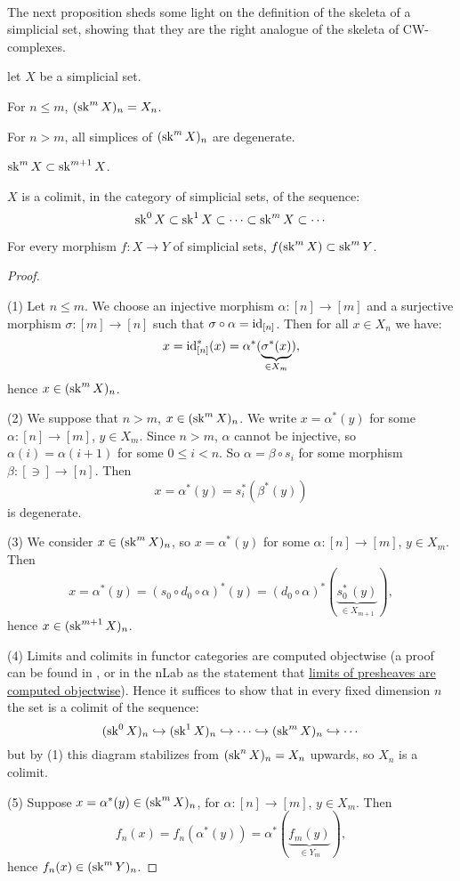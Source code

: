 
\ 


The next proposition sheds some light on the definition of the skeleta of a simplicial set, showing that they are the right analogue of the skeleta of CW-complexes.

\begin{proposition}\label{proposition:getting-to-know-the-simplicial-skeleton}
let $X$ be a simplicial set.
\begin{numerate}
\item For $n\le m$, $(\operatorname{sk}^m X)_n=X_n$.
\item For $n>m$, all simplices of $(\operatorname{sk}^m X)_n$ are degenerate.
\item $\operatorname{sk}^m X\subset \operatorname{sk}^{m+1} X$.
\item $X$ is a colimit, in the category of simplicial sets, of the sequence:
\[\operatorname{sk}^0 X\subset \operatorname{sk}^1 X\subset\cdots\subset \operatorname{sk}^m X\subset\cdots\]
\item For every morphism $f:X\to Y$ of simplicial sets, $f(\operatorname{sk}^m X)\subset\operatorname{sk}^m Y$.
\end{numerate}
\end{proposition}

\begin{proof}\ 

(1) Let $n\le m$. We choose an injective morphism $\alpha:[n]\to[m]$ and a surjective morphism $\sigma:[m]\to[n]$ such that $\sigma\circ\alpha=\operatorname{id}_{[n]}$. Then for all $x\in X_n$ we have:
\[x=\operatorname{id}_{[n]}^*(x)=\alpha^*(\underbrace{\sigma^*(x)}_{\in X_m}),\]
hence $x\in(\operatorname{sk}^m X)_n$.

(2) We suppose that $n>m$, $x\in (\operatorname{sk}^m X)_n$. We write $x=\alpha^*(y)$ for some $\alpha:[n]\to[m]$, $y\in X_m$. Since $n>m$, $\alpha$ cannot be injective, so $\alpha(i)=\alpha(i+1)$ for some $0\le i<n$. So $\alpha=\beta\circ s_i$ for some morphism $\beta:[\ni]\to[n]$. Then
\[x=\alpha^*(y)=s_i^*(\beta^*(y))\]
is degenerate.

(3) We consider $x\in(\operatorname{sk}^m X)_n$, so $x=\alpha^*(y)$ for some $\alpha:[n]\to[m]$, $y\in X_m$. Then
\[x=\alpha^*(y)=(s_0\circ d_0\circ\alpha)^*(y)=(d_0\circ\alpha)^*(\underbrace{s_0^*\,(y)}_{\in X_{m+1}}),\]
hence $x\in(\operatorname{sk}^{m+1} X)_n$.

(4) Limits and colimits in functor categories are computed objectwise (a proof can be found in \cite[Theorem V.5.1]{maclane:71}, or in the nLab as the statement that \href{http://nlab-pages.s3.us-east-2.amazonaws.com/nlab/show/limits+of+presheaves+are+computed+objectwise}{limits of presheaves are computed objectwise}). Hence it suffices to show that in every fixed dimension $n$ the set is a colimit of the sequence:
\[(\operatorname{sk}^0 X)_n\hookrightarrow (\operatorname{sk}^1 X)_n\hookrightarrow\cdots\hookrightarrow (\operatorname{sk}^m X)_n\hookrightarrow\cdots\]
but by (1) this diagram stabilizes from $(\operatorname{sk}^n X)_n=X_n$ upwards, so $X_n$ is a colimit.

(5) Suppose $x=\alpha^*(y)\in(\operatorname{sk}^m X)_n$, for $\alpha:[n]\to[m]$, $y\in X_m$. Then
\[f_n(x)=f_n(\alpha^*(y))=\alpha^*(\underbrace{f_m(y)}_{\in Y_m}),\]
hence $f_n(x)\in(\operatorname{sk}^m Y)_n$.
\end{proof}

